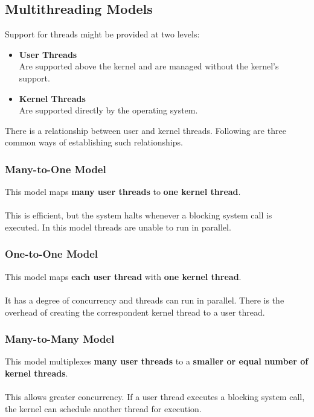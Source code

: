 \documentclass{article}
\begin{document}
\subsection{Multithreading Models}
Support for threads might be provided at two levels:

\begin{itemize}
	\item \textbf{User Threads}
	\vspace{.2cm} \\
	Are supported above the kernel and are managed without the kernel's support.
	
	\item \textbf{Kernel Threads}
	\vspace{.2cm} \\
	Are supported directly by the operating system.
\end{itemize}
There is a relationship between user and kernel threads. Following are three common ways of establishing such relationships.

\subsubsection{Many-to-One Model}
This model maps \textbf{many user threads} to \textbf{one kernel thread}. \\ \\
This is efficient, but the system halts whenever a blocking system call is executed. In this model threads are unable to run in parallel.

\subsubsection{One-to-One Model}
This model maps \textbf{each user thread} with \textbf{one kernel thread}. \\ \\
It has a degree of concurrency and threads can run in parallel. There is the overhead of creating the correspondent kernel thread to a user thread.

\subsubsection{Many-to-Many Model}
This model multiplexes \textbf{many user threads} to a \textbf{smaller or equal number of kernel threads}. \\ \\
This allows greater concurrency. If a user thread executes a blocking system call, the kernel can schedule another thread for execution.
\end{document}
